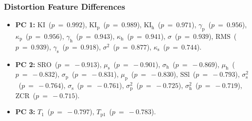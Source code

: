 		\subsubsection*{Distortion Feature Differences}
			\begin{itemize}
				\item {\bf{PC 1:}} $\textrm{KI}$~($p~=~0.992$), $\textrm{KI}_{\textrm{p}}$~($p~=~0.989$),
					$\textrm{KI}_{\textrm{h}}$~($p~=~0.971$), $\gamma_{\textrm{p}}$~($p~=~0.956$),
					$\kappa_{\textrm{p}}$~($p~=~0.956$), $\gamma_{\textrm{h}}$~($p~=~0.943$),
					$\kappa_{\textrm{h}}$~($p~=~0.941$), $\sigma$~($p~=~0.939$),
					$\textrm{RMS}$~($p~=~0.939$), $\gamma_{\textrm{s}}$~($p~=~0.918$),
					$\sigma^{2}$~($p~=~0.877$), $\kappa_{\textrm{s}}$~($p~=~0.744$).
				\item {\bf{PC 2:}} $\textrm{SRO}$~($p~=~-0.913$), $\mu_{\textrm{s}}$~($p~=~-0.901$),
					$\sigma_{\textrm{h}}$~($p~=~-0.869$), $\mu_{\textrm{h}}$~($p~=~-0.832$),
					$\sigma_{\textrm{p}}$~($p~=~-0.831$), $\mu_{\textrm{p}}$~($p~=~-0.830$),
					$\textrm{SSl}$~($p~=~-0.793$), $\sigma_{\textrm{s}}^{2}$~($p~=~-0.764$),
					$\sigma_{\textrm{s}}$~($p~=~-0.761$), $\sigma_{\textrm{p}}^{2}$~($p~=~-0.725$),
					$\sigma_{\textrm{h}}^{2}$~($p~=~-0.719$), $\textrm{ZCR}$~($p~=~-0.715$).
				\item {\bf{PC 3:}} $T_{1}$~($p~=~-0.797$), $T_{\textrm{p}1}$~($p~=~-0.783$).
			\end{itemize}

